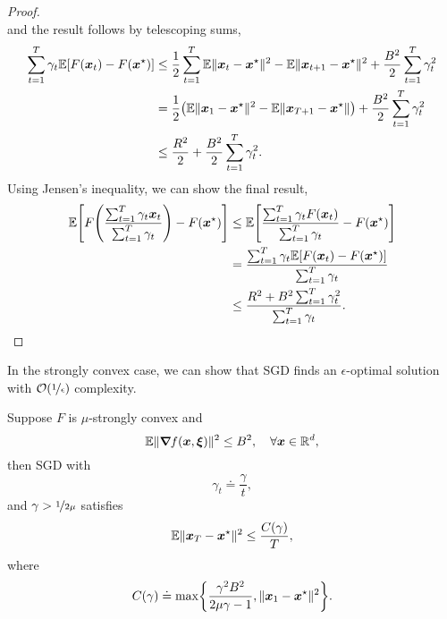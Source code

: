 \begin{proof}
\[    \]
    and the result follows by telescoping sums,
    \begin{align*}
        \sum_{t=1}^{T} \gamma_t \E[F(\vec{x}_t) - F(\vec{x}^\star)] & \leq \frac{1}{2} \sum_{t=1}^{T} \E \| \vec{x}_t - \vec{x}^\star \|^2 - \E \| \vec{x}_{t+1} - \vec{x}^\star \|^2 + \frac{B^2}{2} \sum_{t=1}^{T} \gamma_t^2 \\
                                                                    & = \frac{1}{2} \lft( \E \| \vec{x}_1 - \vec{x}^\star \|^2 - \E \| \vec{x}_{T+1} - \vec{x}^\star \| \rgt) + \frac{B^2}{2} \sum_{t=1}^{T} \gamma_t^2         \\
                                                                    & \leq \frac{R^2}{2} + \frac{B^2}{2} \sum_{t=1}^{T} \gamma_t^2.
    \end{align*}
    Using Jensen's inequality, we can show the final result,
    \begin{align*}
        \E \lft[F \lft( \frac{\sum_{t=1}^{T} \gamma_t \vec{x}_t}{\sum_{t=1}^{T} \gamma_t} \rgt) - F(\vec{x}^\star) \rgt] & \leq \E \lft[ \frac{\sum_{t=1}^{T} \gamma_t F(\vec{x}_t)}{\sum_{t=1}^{T} \gamma_t} - F(\vec{x}^\star) \rgt] \\
                                                                                                                         & = \frac{\sum_{t=1}^{T} \gamma_t \E[F(\vec{x}_t) - F(\vec{x}^\star)]}{\sum_{t=1}^{T} \gamma_t}               \\
                                                                                                                         & \leq \frac{R^2 + B^2 \sum_{t=1}^{T} \gamma_t^2}{\sum_{t=1}^{T} \gamma_t}.
    \end{align*}
\end{proof}

In the strongly convex case, we can show that SGD finds an $\epsilon$-optimal solution with
$\bigo{\nicefrac{1}{\epsilon}}$ complexity.

\begin{theorem}
    Suppose $F$ is $\mu$-strongly convex and \[
        \mathbb{E} \| \bm{\nabla}_{\! } f(\bm{x}, \bm{\xi}) \|^2 \leq B^2, \quad \forall \bm{x} \in \mathbb{R}^d,
    \]
    then SGD with \[
        \gamma_t \doteq \frac{\gamma}{t},
    \]
    and $\gamma > \nicefrac{1}{2 \mu}$ satisfies \[
        \mathbb{E} \| \bm{x}_T - \bm{x}^\star \|^2 \leq \frac{C(\gamma)}{T},
    \]
    where \[
        C(\gamma) \doteq \max \lft\{ \frac{\gamma^2 B^2}{2 \mu \gamma - 1}, \| \vec{x}_1 - \vec{x}^\star \|^2 \rgt\}.
    \]
\end{theorem}


